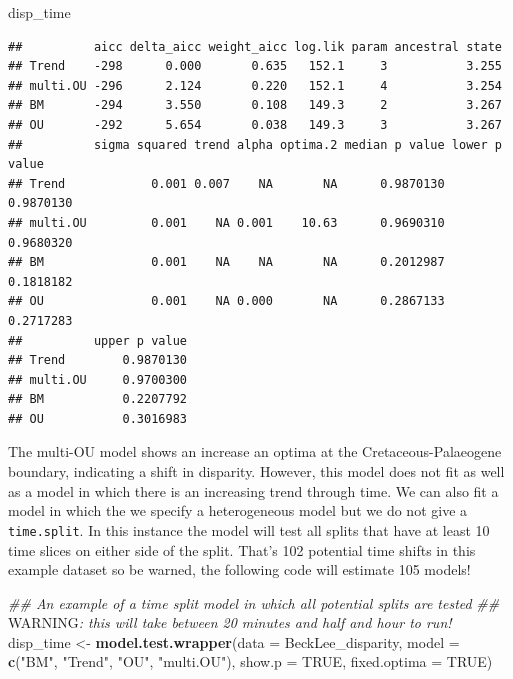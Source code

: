 \documentclass[
]{book}
\newenvironment{Shaded}{\begin{snugshade}}{\end{snugshade}}
\newcommand{\AlertTok}[1]{\textcolor[rgb]{0.94,0.16,0.16}{#1}}
\newcommand{\CommentTok}[1]{\textcolor[rgb]{0.56,0.35,0.01}{\textit{#1}}}
\newcommand{\DataTypeTok}[1]{\textcolor[rgb]{0.13,0.29,0.53}{#1}}
\newcommand{\KeywordTok}[1]{\textcolor[rgb]{0.13,0.29,0.53}{\textbf{#1}}}
\newcommand{\NormalTok}[1]{#1}
\newcommand{\OtherTok}[1]{\textcolor[rgb]{0.56,0.35,0.01}{#1}}
\newcommand{\StringTok}[1]{\textcolor[rgb]{0.31,0.60,0.02}{#1}}
\begin{document}
\begin{Shaded}
\begin{Highlighting}[]
\NormalTok{disp\_time}
\end{Highlighting}
\end{Shaded}

\begin{verbatim}
##          aicc delta_aicc weight_aicc log.lik param ancestral state
## Trend    -298      0.000       0.635   152.1     3           3.255
## multi.OU -296      2.124       0.220   152.1     4           3.254
## BM       -294      3.550       0.108   149.3     2           3.267
## OU       -292      5.654       0.038   149.3     3           3.267
##          sigma squared trend alpha optima.2 median p value lower p value
## Trend            0.001 0.007    NA       NA      0.9870130     0.9870130
## multi.OU         0.001    NA 0.001    10.63      0.9690310     0.9680320
## BM               0.001    NA    NA       NA      0.2012987     0.1818182
## OU               0.001    NA 0.000       NA      0.2867133     0.2717283
##          upper p value
## Trend        0.9870130
## multi.OU     0.9700300
## BM           0.2207792
## OU           0.3016983
\end{verbatim}

The multi-OU model shows an increase an optima at the Cretaceous-Palaeogene boundary, indicating a shift in disparity.
However, this model does not fit as well as a model in which there is an increasing trend through time.
We can also fit a model in which the we specify a heterogeneous model but we do not give a \texttt{time.split}.
In this instance the model will test all splits that have at least 10 time slices on either side of the split.
That's 102 potential time shifts in this example dataset so be warned, the following code will estimate 105 models!

\begin{Shaded}
\begin{Highlighting}[]
\CommentTok{\#\# An example of a time split model in which all potential splits are tested}
\CommentTok{\#\# }\AlertTok{WARNING}\CommentTok{: this will take between 20 minutes and half and hour to run!}
\NormalTok{disp\_time \textless{}{-}}\StringTok{ }\KeywordTok{model.test.wrapper}\NormalTok{(}\DataTypeTok{data =}\NormalTok{ BeckLee\_disparity,}
                        \DataTypeTok{model =} \KeywordTok{c}\NormalTok{(}\StringTok{"BM"}\NormalTok{, }\StringTok{"Trend"}\NormalTok{, }\StringTok{"OU"}\NormalTok{, }\StringTok{"multi.OU"}\NormalTok{),}
                                \DataTypeTok{show.p =} \OtherTok{TRUE}\NormalTok{, }\DataTypeTok{fixed.optima =} \OtherTok{TRUE}\NormalTok{)}
\end{Highlighting}
\end{Shaded}
\end{document}
